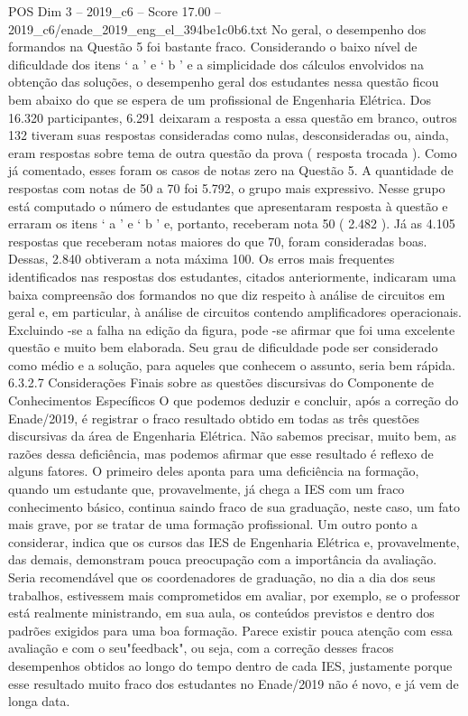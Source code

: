 \begin{textsample}{POS Dim 3 – 2019\_c6 – Score 17.00 – 2019\_c6/enade\_2019\_eng\_el\_394be1c0b6.txt}
No geral, o desempenho dos formandos na Questão 5 foi bastante fraco.
Considerando o baixo nível de dificuldade dos itens ‘ a ’ e ‘ b ’ e a simplicidade dos cálculos envolvidos na obtenção das soluções, o desempenho geral dos estudantes nessa questão ficou bem abaixo do que se espera de um profissional de Engenharia Elétrica.
Dos 16.320 participantes, 6.291 deixaram a resposta a essa questão em branco, outros 132 tiveram suas respostas consideradas como nulas, desconsideradas ou, ainda, eram respostas sobre tema de outra questão da prova ( resposta trocada ).
Como já comentado, esses foram os casos de notas zero na Questão 5.
A quantidade de respostas com notas de 50 a 70 foi 5.792, o grupo mais expressivo.
Nesse grupo está computado o número de estudantes que apresentaram resposta à questão e erraram os itens ‘ a ’ e ‘ b ’ e, portanto, receberam nota 50 ( 2.482 ).
Já as 4.105 respostas que receberam notas maiores do que 70, foram consideradas boas.
Dessas, 2.840 obtiveram a nota máxima 100.
Os erros mais frequentes identificados nas respostas dos estudantes, citados anteriormente, indicaram uma baixa compreensão dos formandos no que diz respeito à análise de circuitos em geral e, em particular, à análise de circuitos contendo amplificadores operacionais.
Excluindo -se a falha na edição da figura, pode -se afirmar que foi uma excelente questão e muito bem elaborada.
Seu grau de dificuldade pode ser considerado como médio e a solução, para aqueles que conhecem o assunto, seria bem rápida. 6.3.2.7 Considerações Finais sobre as questões discursivas do Componente de Conhecimentos Específicos O que podemos deduzir e concluir, após a correção do Enade/2019, é registrar o fraco resultado obtido em todas as três questões discursivas da área de Engenharia Elétrica.
Não sabemos precisar, muito bem, as razões dessa deficiência, mas podemos afirmar que esse resultado é reflexo de alguns fatores.
O primeiro deles aponta para uma deficiência na formação, quando um estudante que, provavelmente, já chega a IES com um fraco conhecimento básico, continua saindo fraco de sua graduação, neste caso, um fato mais grave, por se tratar de uma formação profissional.
Um outro ponto a considerar, indica que os cursos das IES de Engenharia Elétrica e, provavelmente, das demais, demonstram pouca preocupação com a importância da avaliação.
Seria recomendável que os coordenadores de graduação, no dia a dia dos seus trabalhos, estivessem mais comprometidos em avaliar, por exemplo, se o professor está realmente ministrando, em sua aula, os conteúdos previstos e dentro dos padrões exigidos para uma boa formação.
Parece existir pouca atenção com essa avaliação e com o seu"feedback", ou seja, com a correção desses fracos desempenhos obtidos ao longo do tempo dentro de cada IES, justamente porque esse resultado muito fraco dos estudantes no Enade/2019 não é novo, e já vem de longa data.

\end{textsample}
